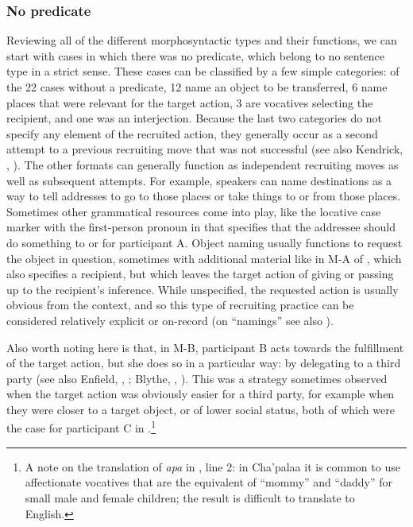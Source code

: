 \documentclass[output=paper]{langsci/langscibook}
\begin{document}
\subsubsection{No predicate}\label{sec:floyd:3.3.1}

Reviewing all of the different morphosyntactic types and their functions, we can start with cases in which there was no predicate, which belong to no sentence type in a strict sense. These cases can be classified by a few simple categories: of the 22 cases without a predicate, 12 name an object to be transferred, 6 name places that were relevant for the target action, 3 are vocatives selecting the recipient, and one was an interjection. Because the last two categories do not specify any element of the recruited action, they generally occur as a second attempt to a previous recruiting move that was not successful (see also Kendrick, , ). The other formats can generally function as independent recruiting moves as well as subsequent attempts. For example, speakers can name destinations as a way to tell addresses to go to those places or take things to or from those places. Sometimes other grammatical resources come into play, like the locative case marker with the first-person pronoun in  that specifies that the addressee should do something to or for participant A. Object naming usually functions to request the object in question, sometimes with additional material like in M-A of , which also specifies a recipient, but which leaves the target action of giving or passing up to the recipient’s inference. While unspecified, the requested action is usually obvious from the context, and so this type of recruiting practice can be considered relatively explicit or on-record (on “namings” see also \citealt[chap. 2]{Rossi2015a}).

Also worth noting here is that, in M-B, participant B acts towards the fulfillment of the target action, but she does so in a particular way: by delegating to a third party (see also Enfield, , ; Blythe, , ). This was a strategy sometimes observed when the target action was obviously easier for a third party, for example when they were closer to a target object, or of lower social status, both of which were the case for participant C in .\footnote{A note on the translation of \textit{apa} in , line 2: in Cha’palaa it is common to use affectionate vocatives that are the equivalent of “mommy” and “daddy” for small male and female children; the result is difficult to translate to English.}
\end{document}
